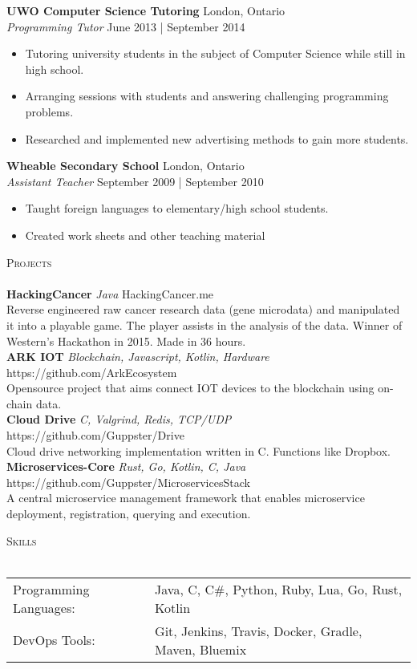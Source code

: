 \documentclass[a4paper]{article}
\newcommand{\lineunder} {
    \vspace*{-8pt} \\
    \hspace*{-18pt} \hrulefill \\
}
\newcommand{\header} [1] {
    {\hspace*{-18pt}\vspace*{6pt} \textsc{#1}}
    \vspace*{-6pt} \lineunder
}
\begin{document}
\textbf{UWO Computer Science Tutoring} \hfill London, Ontario\\
\textit{Programming Tutor} \hfill June 2013 | September 2014\\
\vspace{-1mm}
\begin{itemize} \itemsep 1pt
	\item Tutoring university students in the subject of Computer Science while still in high school.
	\item Arranging sessions with students and answering challenging programming problems.
	\item Researched and implemented new advertising methods to gain more students.
\end{itemize}

\textbf{Wheable Secondary School} \hfill London, Ontario\\
\textit{Assistant Teacher} \hfill September 2009 | September 2010\\
\vspace{-1mm}
\begin{itemize} \itemsep 1pt
	\item Taught foreign languages to elementary/high school students.
	\item Created work sheets and other teaching material
\end{itemize}

\header{Projects}
{\textbf{HackingCancer} \sl Java} \hfill HackingCancer.me\\
Reverse engineered raw cancer research data (gene microdata) and manipulated it into a playable game. The player assists in the analysis of the data. Winner of Western’s Hackathon in 2015. Made in 36 hours.\\
\vspace*{2mm}
{\textbf{ARK IOT} \sl Blockchain, Javascript, Kotlin, Hardware} \hfill https://github.com/ArkEcosystem\\
Opensource project that aims connect IOT devices to the blockchain using on-chain data.\\
\vspace*{2mm}
{\textbf{Cloud Drive} \sl C, Valgrind, Redis, TCP/UDP} \hfill https://github.com/Guppster/Drive\\
Cloud drive networking implementation written in C. Functions like Dropbox.\\
\vspace*{2mm}
{\textbf{Microservices-Core} \sl Rust, Go, Kotlin, C, Java} \hfill https://github.com/Guppster/MicroservicesStack\\
A central microservice management framework that enables microservice deployment, registration, querying and execution.\\

\vspace*{2mm}

\header{Skills}
\begin{tabular}{ l l }
	Programming Languages: & Java, C, C\#, Python, Ruby, Lua, Go, Rust, Kotlin    \\
	DevOps Tools:          & Git, Jenkins, Travis, Docker, Gradle, Maven, Bluemix \\
\end{tabular}

\vspace*{2mm}

\vspace*{2mm}
        

\ 
\end{document}
